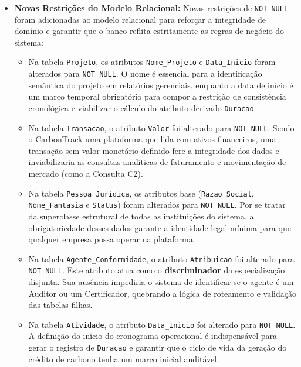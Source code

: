 \documentclass[12pt]{article}
\begin{document}
\begin{itemize}
    \item \textbf{Novas Restrições do Modelo Relacional:} Novas restrições de \texttt{NOT NULL} foram adicionadas ao modelo relacional para reforçar a integridade de domínio e garantir que o banco reflita estritamente as regras de negócio do sistema:
    \begin{itemize}
        \item Na tabela \texttt{Projeto}, os atributos \texttt{Nome\_Projeto} e \texttt{Data\_Inicio} foram alterados para \texttt{NOT NULL}. O nome é essencial para a identificação semântica do projeto em relatórios gerenciais, enquanto a data de início é um marco temporal obrigatório para compor a restrição de consistência cronológica e viabilizar o cálculo do atributo derivado \texttt{Duracao}.
        
        \item Na tabela \texttt{Transacao}, o atributo \texttt{Valor} foi alterado para \texttt{NOT NULL}. Sendo o CarbonTrack uma plataforma que lida com ativos financeiros, uma transação sem valor monetário definido fere a integridade dos dados e inviabilizaria as consultas analíticas de faturamento e movimentação de mercado (como a Consulta C2).
        
        \item Na tabela \texttt{Pessoa\_Juridica}, os atributos base (\texttt{Razao\_Social}, \texttt{Nome\_Fantasia} e \texttt{Status}) foram alterados para \texttt{NOT NULL}. Por se tratar da superclasse estrutural de todas as instituições do sistema, a obrigatoriedade desses dados garante a identidade legal mínima para que qualquer empresa possa operar na plataforma.
        
        \item Na tabela \texttt{Agente\_Conformidade}, o atributo \texttt{Atribuicao} foi alterado para \texttt{NOT NULL}. Este atributo atua como o \textbf{discriminador} da especialização disjunta. Sua ausência impediria o sistema de identificar se o agente é um Auditor ou um Certificador, quebrando a lógica de roteamento e validação das tabelas filhas.
        
        \item Na tabela \texttt{Atividade}, o atributo \texttt{Data\_Inicio} foi alterado para \texttt{NOT NULL}. A definição do início do cronograma operacional é indispensável para gerar o registro de \texttt{Duracao} e garantir que o ciclo de vida da geração do crédito de carbono tenha um marco inicial auditável.
        

\end{itemize}
\end{itemize}
\end{document}
